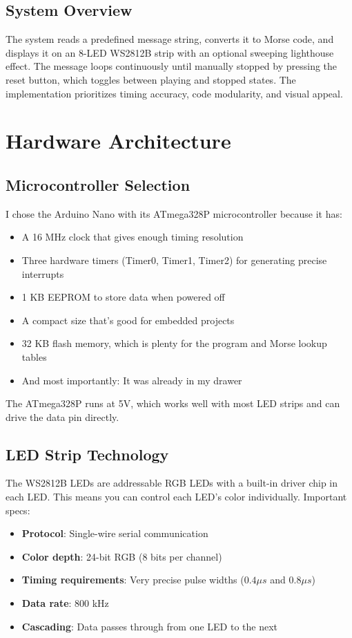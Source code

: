 \documentclass[report]{IEEEtran}
\begin{document}
\subsection{System Overview}
The system reads a predefined message string, converts it to Morse code, and displays it on an 8-LED WS2812B strip with an optional sweeping lighthouse effect. 
The message loops continuously until manually stopped by pressing the reset button, which toggles between playing and stopped states. 
The implementation prioritizes timing accuracy, code modularity, and visual appeal.

\section{Hardware Architecture}

\subsection{Microcontroller Selection}
I chose the Arduino Nano with its ATmega328P microcontroller because it has:
\begin{itemize}
    \item A 16 MHz clock that gives enough timing resolution
    \item Three hardware timers (Timer0, Timer1, Timer2) for generating precise interrupts
    \item 1 KB EEPROM to store data when powered off
    \item A compact size that's good for embedded projects
    \item 32 KB flash memory, which is plenty for the program and Morse lookup tables
    \item And most importantly: It was already in my drawer
\end{itemize}

The ATmega328P runs at 5V, which works well with most LED strips and can drive the data pin directly.

\subsection{LED Strip Technology}
The WS2812B LEDs are addressable RGB LEDs with a built-in driver chip in each LED. 
This means you can control each LED's color individually. Important specs:
\begin{itemize}
    \item \textbf{Protocol}: Single-wire serial communication
    \item \textbf{Color depth}: 24-bit RGB (8 bits per channel)
    \item \textbf{Timing requirements}: Very precise pulse widths ($0.4\mu s$ and $0.8\mu s$)
    \item \textbf{Data rate}: 800 kHz
    \item \textbf{Cascading}: Data passes through from one LED to the next
\end{itemize}
\end{document}
